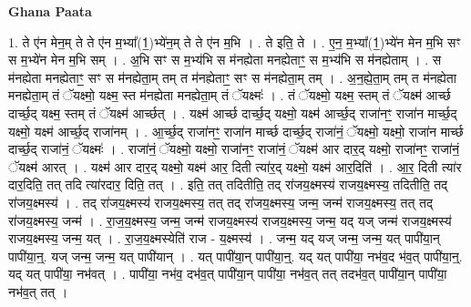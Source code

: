 \documentclass[17pt]{extarticle}
\begin{document}
\textbf{Ghana Paata } \newline

1. ते ए॑न मेन॒म् ते ते ए॑न म॒भ्या᳚(1॒)भ्ये॑न॒म् ते ते ए॑न म॒भि । . ते इति॒ ते । . ए॒न॒ म॒भ्या᳚(1॒)भ्ये॑न मेन म॒भि सꣳ स म॒भ्ये॑न मेन म॒भि सम् । . अ॒भि सꣳ स म॒भ्य॑भि स म॑नह्येता मनह्येताꣳ॒॒ स म॒भ्य॑भि स म॑नह्येताम् । . स म॑नह्येता मनह्येताꣳ॒॒ सꣳ स म॑नह्येता॒म् तम् त म॑नह्येताꣳ॒॒ सꣳ स म॑नह्येता॒म् तम् । . अ॒न॒ह्ये॒ता॒म् तम् त म॑नह्येता मनह्येता॒म् तं ॅयक्ष्मो॒ यक्ष्म॒ स्त म॑नह्येता मनह्येता॒म् तं ॅयक्ष्मः॑ । . तं ॅयक्ष्मो॒ यक्ष्म॒ स्तम् तं ॅयक्ष्म॑ आर्च्छ दार्च्छ॒द् यक्ष्म॒ स्तम् तं ॅयक्ष्म॑ आर्च्छत् । . यक्ष्म॑ आर्च्छ दार्च्छ॒द् यक्ष्मो॒ यक्ष्म॑ आर्च्छ॒द् राजा॑नꣳ॒॒ राजा॑न मार्च्छ॒द् यक्ष्मो॒ यक्ष्म॑ आर्च्छ॒द् राजा॑नम् । . आ॒र्च्छ॒द् राजा॑नꣳ॒॒ राजा॑न मार्च्छ दार्च्छ॒द् राजा॑नं॒ ॅयक्ष्मो॒ यक्ष्मो॒ राजा॑न मार्च्छ दार्च्छ॒द् राजा॑नं॒ ॅयक्ष्मः॑ । . राजा॑नं॒ ॅयक्ष्मो॒ यक्ष्मो॒ राजा॑नꣳ॒॒ राजा॑नं॒ ॅयक्ष्म॑ आर दार॒द् यक्ष्मो॒ राजा॑नꣳ॒॒ राजा॑नं॒ ॅयक्ष्म॑ आरत् । . यक्ष्म॑ आर दार॒द् यक्ष्मो॒ यक्ष्म॑ आर॒ दिती त्या॑र॒द् यक्ष्मो॒ यक्ष्म॑ आर॒दिति॑ । . आ॒र॒ दिती त्या॑र दार॒दिति॒ तत् तदि त्या॑रदार॒ दिति॒ तत् । . इति॒ तत् तदितीति॒ तद् रा॑जय॒क्ष्मस्य॑ राजय॒क्ष्मस्य॒ तदितीति॒ तद् रा॑जय॒क्ष्मस्य॑ । . तद् रा॑जय॒क्ष्मस्य॑ राजय॒क्ष्मस्य॒ तत् तद् रा॑जय॒क्ष्मस्य॒ जन्म॒ जन्म॑ राजय॒क्ष्मस्य॒ तत् तद् रा॑जय॒क्ष्मस्य॒ जन्म॑ । . रा॒ज॒य॒क्ष्मस्य॒ जन्म॒ जन्म॑ राजय॒क्ष्मस्य॑ राजय॒क्ष्मस्य॒ जन्म॒ यद् यज् जन्म॑ राजय॒क्ष्मस्य॑ राजय॒क्ष्मस्य॒ जन्म॒ यत् । . रा॒ज॒य॒क्ष्मस्येति॑ राज - य॒क्ष्मस्य॑ । . जन्म॒ यद् यज् जन्म॒ जन्म॒ यत् पापी॑या॒न् पापी॑या॒न्॒. यज् जन्म॒ जन्म॒ यत् पापी॑यान् । . यत् पापी॑या॒न् पापी॑या॒न्॒. यद् यत् पापी॑या॒ नभ॑व॒द भ॑व॒त् पापी॑या॒न्॒. यद् यत् पापी॑या॒ नभ॑वत् । . पापी॑या॒ नभ॑व॒ दभ॑व॒त् पापी॑या॒न् पापी॑या॒ नभ॑व॒त् तत् तदभ॑व॒त् पापी॑या॒न् पापी॑या॒ नभ॑व॒त् तत् । \newline
\end{document}
